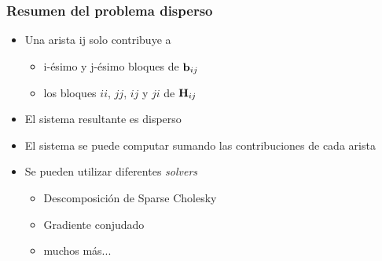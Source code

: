 \begin{frame}
    \frametitle{Resumen del problema disperso}
    
    \begin{itemize}
        \item Una arista ij solo contribuye a
        \begin{itemize}
            \item i-ésimo y j-ésimo bloques de $\boldsymbol{\mathbf{b}}_{ij}$
            \item los bloques $ii$, $jj$, $ij$ y $ji$ de $\boldsymbol{\mathbf{H}}_{ij}$
        \end{itemize}
        \item El sistema resultante es disperso
        \item El sistema se puede computar sumando las contribuciones de cada arista
        \item Se pueden utilizar diferentes \emph{solvers}
        \begin{itemize}
            \item Descomposición de Sparse Cholesky
            \item Gradiente conjudado
            \item muchos más...
        \end{itemize}

    \end{itemize}
    
    
\end{frame}

